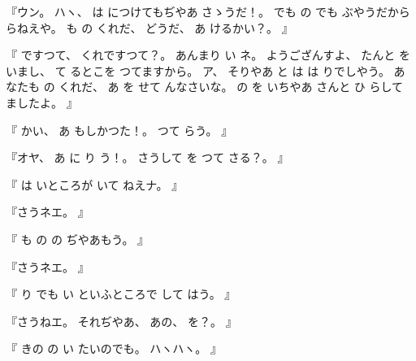 %
『ウン。
%
ハヽ、
%
は
につけてもぢやあ
さゝうだ！。
%
でも
の
でも
ぶやうだから
らねえや。
%
も
の
くれだ、
%
どうだ、
%
あ
けるかい？。
』

%
『
ですつて、
%
くれですつて？。
%
あんまり
い
ネ。
%
ようござんすよ、
%
たんと
を
いまし、
%
て
るとこを
つてますから。
%
ア、
%
そりやあ
と
は
は
りでしやう。
%
あなたも
の
くれだ、
%
あ
を
せて
んなさいな。
%
の
を
いちやあ
さんと
ひ
らして
ましたよ。
』

%
『
かい、
%
あ
もしかつた！。
%
つて
らう。
』

%
『オヤ、
%
あ
に
り
う！。
%
さうして
を
つて
さる？。
』

%
『
は%
いところが
いて
ねえナ。
』

%
『さうネエ。
』

%
『
も
の
の
ぢやあもう。
』

%
『さうネエ。
』

%
『
り
でも
い
といふところで
して%
はう。
』

%
『さうねエ。
%
それぢやあ、
%
あの、
%
を？。
』

%
『
きの
の%
い
たいのでも。
%
ハヽハヽ。
』

